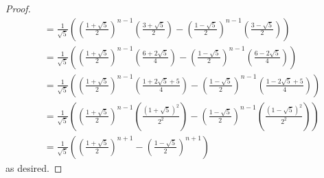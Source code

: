 \documentclass[../apprentice.tex]{subfiles}
\begin{document}
\begin{enumerate}
\begin{enumerate}
\begin{proof}
\begin{align*}
                &= \frac{1}{\sqrt{5}}\left( \left( \frac{1+\sqrt{5}}{2} \right)^{n-1}\left( \frac{3+\sqrt{5}}{2} \right)-\left( \frac{1-\sqrt{5}}{2} \right)^{n-1}\left( \frac{3-\sqrt{5}}{2} \right) \right)\\
                &= \frac{1}{\sqrt{5}}\left( \left( \frac{1+\sqrt{5}}{2} \right)^{n-1}\left( \frac{6+2\sqrt{5}}{4} \right)-\left( \frac{1-\sqrt{5}}{2} \right)^{n-1}\left( \frac{6-2\sqrt{5}}{4} \right) \right)\\
                &= \frac{1}{\sqrt{5}}\left( \left( \frac{1+\sqrt{5}}{2} \right)^{n-1}\left( \frac{1+2\sqrt{5}+5}{4} \right)-\left( \frac{1-\sqrt{5}}{2} \right)^{n-1}\left( \frac{1-2\sqrt{5}+5}{4} \right) \right)\\
                &= \frac{1}{\sqrt{5}}\left( \left( \frac{1+\sqrt{5}}{2} \right)^{n-1}\left( \frac{(1+\sqrt{5})^2}{2^2} \right)-\left( \frac{1-\sqrt{5}}{2} \right)^{n-1}\left( \frac{(1-\sqrt{5})^2}{2^2} \right) \right)\\
                &= \frac{1}{\sqrt{5}}\left( \left( \frac{1+\sqrt{5}}{2} \right)^{n+1}-\left( \frac{1-\sqrt{5}}{2} \right)^{n+1} \right)
            \end{align*}
            \endgroup
            as desired.
        \end{proof}
    \end{enumerate}
\end{enumerate}
\end{document}
